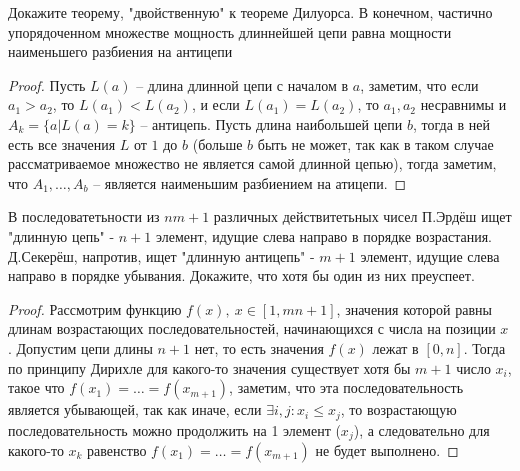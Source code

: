 \begin{prob}
Докажите теорему, "двойственную" к теореме Дилуорса. В конечном, частично упорядоченном множестве мощность длиннейшей цепи равна мощности наименьшего разбиения на антицепи
\end{prob}
\begin{proof}
	Пусть $L(a)$ -- длина длинной цепи с началом в $a$, заметим, что если $a_1 > a_2$, то $L(a_1) < L(a_2)$, и если $L(a_1) = L(a_2)$, то $a_1, a_2$ несравнимы и $A_k = \{a| L(a) = k\}$ -- антицепь. Пусть длина наибольшей цепи $b$, тогда в ней есть все значения $L$ от $1$ до $b$ (больше $b$ быть не может, так как в таком случае рассматриваемое множество не является самой длинной цепью), тогда заметим, что $A_{1}, \ldots, A_{b}$ -- является наименьшим разбиением на атицепи.
\end{proof}
\vskip 0.6in



\begin{prob}
В последоватетьности из $n m + 1$ различных действитетьных чисел П.Эрдёш ищет "длинную цепь" - $n + 1$ элемент, идущие слева направо в порядке возрастания. Д.Секерёш, напротив, ищет "длинную антицепь" - $m + 1$ элемент, идущие слева направо в порядке убывания. Докажите, что хотя бы один из них преуспеет.
\end{prob}
\begin{proof}
	Рассмотрим функцию $f(x),\ x \in [1, mn+1]$, значения которой равны длинам возрастающих последовательностей, начинающихся с числа на позиции $x$. Допустим цепи длины $n+1$ нет, то есть значения $f(x)$ лежат в $[0, n]$. Тогда по принципу Дирихле для какого-то значения существует хотя бы $m+1$ число $x_i$, такое что $f(x_1) = \ldots = f(x_{m+1})$, заметим, что эта последовательность является убывающей, так как иначе, если $\exists i,j: x_{i} \leqslant x_{j}$, то возрастающую последовательность можно продолжить на 1 элемент ($x_{j}$), а следовательно для какого-то $x_{k}$ равенство $f(x_1) = \ldots = f(x_{m+1})$ не будет выполнено.
\end{proof}



